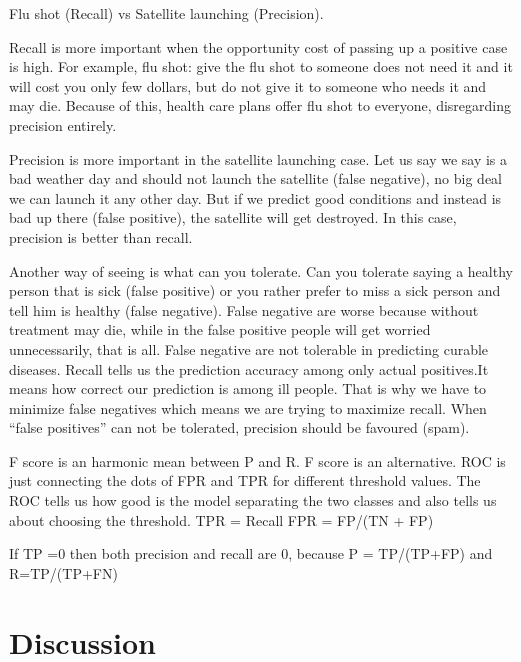 \documentclass[preprint,12pt]{elsarticle}
\begin{document}
Flu shot (Recall) vs Satellite launching (Precision).

Recall is more important when the opportunity cost of passing up a positive case is high. For example, flu  shot: give the flu shot to someone does not need it and it will cost you only few dollars, but do not give it to someone who needs it and may die. Because of this, health care plans offer flu shot to everyone, disregarding precision entirely.

Precision is more important in the satellite launching case. Let us say we say is a bad weather day and should not launch the satellite (false negative), no big deal we can launch it any other day. But if we predict good conditions and instead is bad up there (false positive), the satellite will get destroyed. In this case, precision is better than recall.

Another way of seeing is what can you tolerate. Can you tolerate saying a healthy person that is sick (false positive) or you rather prefer to miss a sick person and tell him is healthy (false negative). False negative are worse because without treatment may die, while in the false positive people will get worried unnecessarily, that is all. False negative are not tolerable in predicting curable diseases.
Recall tells us the prediction accuracy among only actual positives.It means how correct our prediction is among ill people. That is why we have to minimize false negatives which means we are trying to maximize recall.
When “false positives” can not be tolerated, precision should be favoured (spam).

F score is an harmonic mean between P and R. F score is an alternative. 
ROC is just connecting the dots of FPR and TPR for different threshold values. The ROC tells us how good is the model separating the two classes and also tells us about choosing the threshold.
TPR = Recall
FPR = FP/(TN + FP)

If TP =0 then both precision and recall are 0, because P = TP/(TP+FP) and R=TP/(TP+FN)

\section{Discussion}
\label{se:dis}
\end{document}

